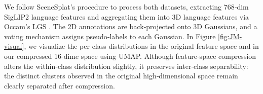 \documentclass[runningheads]{llncs}
\begin{document}
We follow SceneSplat’s procedure to process both datasets, extracting 768‑dim SigLIP2 \cite{tschannen2025siglip} language features and aggregating them into 3D language features via Occam’s LGS \cite{cheng2024occamslgssimpleapproach}. The 2D annotations are back‑projected onto 3D Gaussians, and a voting mechanism assigns pseudo‑labels to each Gaussian. In Figure \ref{fig:JM-visual}, we visualize the per‑class distributions in the original feature space and in our compressed 16‑dime space using UMAP.
Although feature‑space compression alters the within‑class distribution slightly, it preserves inter‑class separability: the distinct clusters observed in the original high‑dimensional space remain clearly separated after compression.
\end{document}
